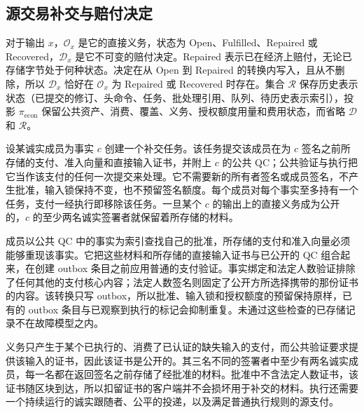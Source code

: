 \subsection{源交易补交与赔付决定}
\label{sec:security-decision}

对于输出 $x$，$\mathcal O_x$ 是它的直接义务，状态为 Open、Fulfilled、Repaired 或 Recovered，$\mathcal D_x$ 是它不可变的赔付决定。Repaired 表示已在经济上赔付，无论已存储字节处于何种状态。决定在从 Open 到 Repaired 的转换内写入，且从不删除，所以 $\mathcal D_x$ 恰好在 $\mathcal O_x$ 为 Repaired 或 Recovered 时存在。集合 $\mathcal R$ 保存历史表示状态（已提交的修订、头命令、任务、批处理引用、队列、待历史表示索引），投影 $\pi_{\mathrm{econ}}$ 保留公共资产、消费、覆盖、义务、授权额度用量和费用状态，而省略 $\mathcal D$ 和 $\mathcal R$。

\begin{lemma}[补交保持授权]
\label{lem:security-resubmission}
设某诚实成员为事实 $c$ 创建一个补交任务。该任务提交该成员在为 $c$ 签名之前所存储的支付、准入向量和直接输入证书，并附上 $c$ 的公共 QC；公共验证与执行把它当作该支付的任何一次提交来处理。它不需要新的所有者签名或成员签名，不产生批准，输入锁保持不变，也不预留签名额度。每个成员对每个事实至多持有一个任务，支付一经执行即移除该任务。一旦某个 $c$ 的输出上的直接义务成为公开的，$c$ 的至少两名诚实签署者就保留着所存储的材料。
\end{lemma}
\begin{IEEEproof}
成员以公共 QC 中的事实为索引查找自己的批准，所存储的支付和准入向量必须能够重现该事实。它把这些材料和所存储的直接输入证书与已公开的 QC 组合起来，在创建 outbox 条目之前应用普通的支付验证。事实绑定和法定人数验证排除了任何其他的支付核心内容；法定人数签名则固定了公开方所选择携带的那份证书的内容。该转换只写 outbox，所以批准、输入锁和授权额度的预留保持原样，已有的 outbox 条目与已观察到执行的标记会抑制重复。未通过这些检查的已存储记录不在故障模型之内。

义务只产生于某个已执行的、消费了已认证的缺失输入的支付，而公共验证要求提供该输入的证书，因此该证书是公开的。其三名不同的签署者中至少有两名诚实成员，每一名都在返回签名之前存储了经批准的材料。批准中不含法定人数证书，该证书随区块到达，所以扣留证书的客户端并不会损坏用于补交的材料。执行还需要一个持续运行的诚实跟随者、公平的投递，以及满足普通执行规则的源支付。
\end{IEEEproof}


